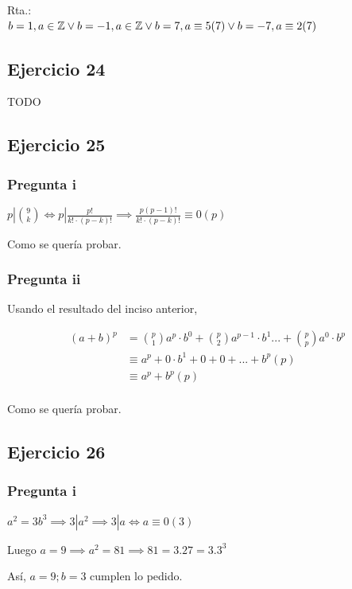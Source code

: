 Rta.: \\
$b = 1, a \in \mathbb{Z} \vee \\b = -1, a \in \mathbb{Z} \vee \\b = 7, a \equiv 5(7) \vee \\b = -7, a \equiv 2(7)$

\subsection{Ejercicio 24}
TODO

\subsection{Ejercicio 25}
\subsubsection{Pregunta i}
$ p|\binom{9}{k} \iff p|\frac{p!}{k! \cdot (p-k)!} \implies \frac{p(p-1)!}{k! \cdot (p-k)!} \equiv 0(p)$

Como se quería probar.

\subsubsection{Pregunta ii}
Usando el resultado del inciso anterior,

\begin{align*}
    (a+b)^p &= \binom{p}{1}a^p \cdot b^0 + \binom{p}{2}a^{p-1} \cdot b^1 ... + \binom{p}{p}a^0 \cdot b^p \\
    &\equiv a^p + 0 \cdot b^1 + 0 + 0 + ... + b^p (p) \\
    &\equiv a^p + b^p (p)\\
\end{align*}

Como se quería probar.

\subsection{Ejercicio 26}
\subsubsection{Pregunta i}

$ a^2 = 3b^3 \implies 3|a^2 \implies 3|a \iff a \equiv 0(3)$

Luego $ a = 9 \implies a^2 = 81 \implies 81 = 3.27 = 3.3^3$  

Así, $ a = 9; b = 3 $ cumplen lo pedido.

